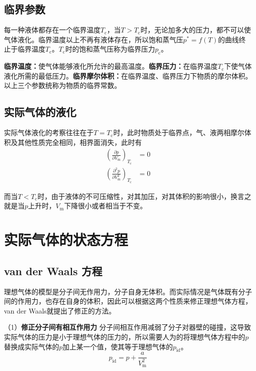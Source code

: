 \documentclass[lang=cn,newtx,11pt,scheme=chinese]{elegantbook}
\begin{document}
\subsection{临界参数}
每一种液体都存在一个临界温度$T_\mathrm{c}$，当$T>T_\mathrm{c}$时，无论加多大的压力，都不可以使气体液化。临界温度以上不再有液体存在，所以饱和蒸气压$p^*=f(T)$的曲线终止于临界温度$T_\mathrm{c}$。$T_\mathrm{c}$时的饱和蒸气压称为临界压力$p_\mathrm{c}$。

\textbf{临界温度：}使气体能够液化所允许的最高温度。\textbf{临界压力：}在临界温度$T_\mathrm{c}$下使气体液化所需的最低压力。\textbf{临界摩尔体积：}在临界温度、临界压力下物质的摩尔体积。以上三个参数统称为物质的临界常数。

\subsection{实际气体的液化}
实际气体液化的考察往往在于$T=T_\mathrm{c}$时，此时物质处于临界点，气、液两相摩尔体积及其他性质完全相同，相界面消失，此时有
\begin{equation}
	\begin{aligned}
		\left ( \frac{\partial p}{\partial V_{\mathrm{m} }}  \right )_{T_\mathrm{c} } &= 0 \\[1.5ex]
		\left ( \frac{\partial^2 p}{\partial V^2_{\mathrm{m} }}  \right )_{T_\mathrm{c} } &=0
	\end{aligned}
\end{equation}

而当$T<T_{\mathrm{c}}$时，由于液体的不可压缩性，对其加压，对其体积的影响很小，换言之就是当$p$上升时，$V_\mathrm{m}$下降很小或者相当于不变。

\section{实际气体的状态方程}
\subsection{van der Waals 方程}
理想气体的模型是分子间无作用力，分子自身无体积。而实际情况是气体既有分子间的作用力，也存在自身的体积，因此可以根据这两个性质来修正理想气体方程，van der Waals就提出了修正的方法。

（1）\textbf{修正分子间有相互作用力} \quad 分子间相互作用减弱了分子对器壁的碰撞，这导致实际气体的压力是小于理想气体的压力的，所以需要人为的将理想气体方程中的$p$替换成实际气体的$p$加上某一个值，使其等于理想气体的$p_{\mathrm{id}}$。
\begin{equation}
	p_{\mathrm{id}} = p + \frac{a}{V^2_{\mathrm{m}}}
\end{equation}
\end{document}

